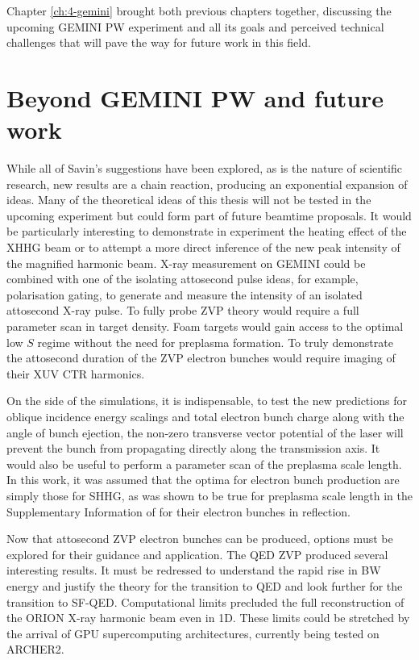 Chapter \ref{ch:4-gemini} brought both previous chapters together, discussing the upcoming GEMINI PW experiment and all its goals and perceived technical challenges that will pave the way for future work in this field.

\section{Beyond GEMINI PW and future work}\label{sec:ch4-beyond}
While all of Savin's suggestions have been explored, as is the nature of scientific research, new results are a chain reaction, producing an exponential expansion of ideas. Many of the theoretical ideas of this thesis will not be tested in the upcoming experiment but could form part of future beamtime proposals. It would be particularly interesting to demonstrate in experiment the heating effect of the XHHG beam or to attempt a more direct inference of the new peak intensity of the magnified harmonic beam. X-ray measurement on GEMINI could be combined with one of the isolating attosecond pulse ideas, for example, polarisation gating, to generate and measure the intensity of an isolated attosecond X-ray pulse. To fully probe ZVP theory would require a full parameter scan in target density. Foam targets would gain access to the optimal low $S$ regime \cite{bataniPhysicsIssuesShock2014} without the need for preplasma formation. To truly demonstrate the attosecond duration of the ZVP electron bunches would require imaging of their XUV CTR harmonics.

On the side of the simulations, it is indispensable, to test the new predictions for oblique incidence energy scalings and total electron bunch charge along with the angle of bunch ejection, the non-zero transverse vector potential of the laser will prevent the bunch from propagating directly along the transmission axis. It would also be useful to perform a parameter scan of the preplasma scale length. In this work, it was assumed that the optima for electron bunch production are simply those for \ac{SHHG}, as was shown to be true for preplasma scale length in the Supplementary Information of \cite{thevenetVacuumLaserAcceleration2016} for their electron bunches in reflection. 

Now that attosecond ZVP electron bunches can be produced, options must be explored for their guidance and application. The QED ZVP produced several interesting results. It must be redressed to understand the rapid rise in BW energy and justify the theory for the transition to QED and look further for the transition to SF-QED. Computational limits precluded the full reconstruction of the ORION X-ray harmonic beam even in 1D. These limits could be stretched by the arrival of GPU supercomputing architectures, currently being tested on ARCHER2. 

